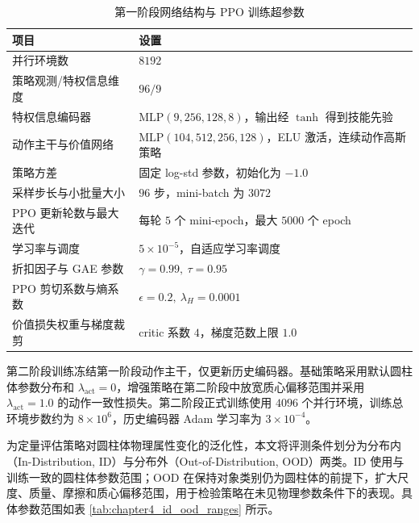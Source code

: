 \begin{table}[htbp]
    \centering
    \caption{第一阶段网络结构与 PPO 训练超参数}
    \label{tab:chapter4_stage1_training_hyperparams}
    \setlength{\tabcolsep}{5pt}
    \renewcommand{\arraystretch}{1.12}
    \begin{tabular}{p{}p{}}
        \toprule
        项目 & 设置 \\
        \midrule
        并行环境数 & \(8192\) \\
        策略观测/特权信息维度 & \(96 / 9\) \\
        特权信息编码器 & \(\mathrm{MLP}(9,256,128,8)\)，输出经 \(\tanh\) 得到技能先验 \\
        动作主干与价值网络 & \(\mathrm{MLP}(104,512,256,128)\)，ELU 激活，连续动作高斯策略 \\
        策略方差 & 固定 log-std 参数，初始化为 \(-1.0\) \\
        采样步长与小批量大小 & \(96\) 步，mini-batch 为 \(3072\) \\
        PPO 更新轮数与最大迭代 & 每轮 \(5\) 个 mini-epoch，最大 \(5000\) 个 epoch \\
        学习率与调度 & \(5\times10^{-5}\)，自适应学习率调度 \\
        折扣因子与 GAE 参数 & \(\gamma=0.99,\ \tau=0.95\) \\
        PPO 剪切系数与熵系数 & \(\epsilon=0.2,\ \lambda_H=0.0001\) \\
        价值损失权重与梯度裁剪 & critic 系数 \(4\)，梯度范数上限 \(1.0\) \\
        \bottomrule
    \end{tabular}
\end{table}

第二阶段训练冻结第一阶段动作主干，仅更新历史编码器。基础策略采用默认圆柱体参数分布和 \(\lambda_{\mathrm{act}}=0\)，增强策略在第二阶段中放宽质心偏移范围并采用 \(\lambda_{\mathrm{act}}=1.0\) 的动作一致性损失。第二阶段正式训练使用 \(4096\) 个并行环境，训练总环境步数约为 \(8\times10^6\)，历史编码器 Adam 学习率为 \(3\times10^{-4}\)。

为定量评估策略对圆柱体物理属性变化的泛化性，本文将评测条件划分为分布内（In-Distribution, ID）与分布外（Out-of-Distribution, OOD）两类。ID 使用与训练一致的圆柱体参数范围；OOD 在保持对象类别仍为圆柱体的前提下，扩大尺度、质量、摩擦和质心偏移范围，用于检验策略在未见物理参数条件下的表现。具体参数范围如表 \ref{tab:chapter4_id_ood_ranges} 所示。

